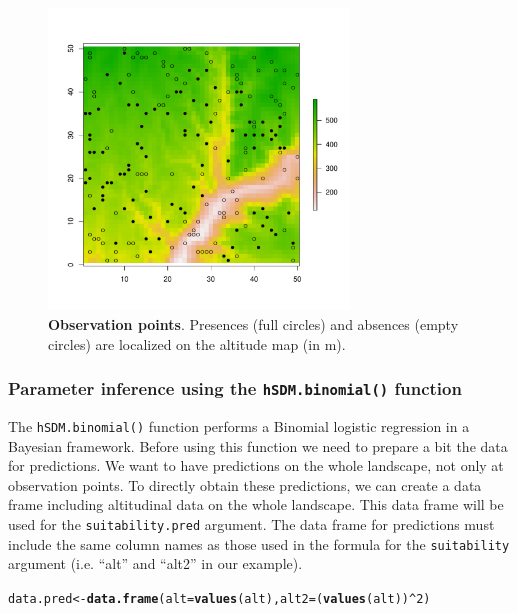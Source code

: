 \documentclass[a4paper, 12pt, leqno]{article}\usepackage[]{graphicx}\usepackage[]{color}
\makeatletter
\newcommand{\hlnum}[1]{\textcolor[rgb]{0.686,0.059,0.569}{#1}}%
\newcommand{\hlopt}[1]{\textcolor[rgb]{0,0,0}{#1}}%
\newcommand{\hlstd}[1]{\textcolor[rgb]{0.345,0.345,0.345}{#1}}%
\newcommand{\hlkwb}[1]{\textcolor[rgb]{0.69,0.353,0.396}{#1}}%
\newcommand{\hlkwc}[1]{\textcolor[rgb]{0.333,0.667,0.333}{#1}}%
\newcommand{\hlkwd}[1]{\textcolor[rgb]{0.737,0.353,0.396}{\textbf{#1}}}%
\newenvironment{kframe}{%
 \def\at@end@of@kframe{}%
 \ifinner\ifhmode%
  \def\at@end@of@kframe{\end{minipage}}%
  \begin{minipage}{\columnwidth}%
 \fi\fi%
 \def\FrameCommand##1{\hskip\@totalleftmargin \hskip-\fboxsep
 \colorbox{shadecolor}{##1}\hskip-\fboxsep
     \hskip-\linewidth \hskip-\@totalleftmargin \hskip\columnwidth}%
 \MakeFramed {\advance\hsize-\width
   \@totalleftmargin\z@ \linewidth\hsize
   \@setminipage}}%
 {\par\unskip\endMakeFramed%
 \at@end@of@kframe}
\newenvironment{knitrout}{}{} %
\makeatother
\begin{document}
\begin{figure}[!h] 
  \centering \includegraphics[width=8cm]{figures/observations-binomial.pdf}
  \caption{\textbf{Observation points}. Presences (full circles) and absences (empty
    circles) are localized on the altitude map (in m).}
  \label{fig:observations-binomial}
\end{figure}

\subsubsection{Parameter inference using the \texttt{hSDM.binomial()} function}

The \texttt{hSDM.binomial()} function performs a Binomial logistic regression in a
Bayesian framework. Before using this function we need to prepare a bit the data for
predictions. We want to have predictions on the whole landscape, not only at observation
points. To directly obtain these predictions, we can create a data frame including
altitudinal data on the whole landscape. This data frame will be used for the
\texttt{suitability.pred} argument. The data frame for predictions must include the same
column names as those used in the formula for the \texttt{suitability} argument
(i.e. ``alt'' and ``alt2'' in our example).

\begin{knitrout}\small
{}\color{fgcolor}\begin{kframe}
\begin{alltt}
\hlstd{data.pred} \hlkwb{<-} \hlkwd{data.frame}\hlstd{(}\hlkwc{alt}\hlstd{=}\hlkwd{values}\hlstd{(alt),}\hlkwc{alt2}\hlstd{=(}\hlkwd{values}\hlstd{(alt))}\hlopt{^}\hlnum{2}\hlstd{)}
\end{alltt}
\end{kframe}
\end{knitrout}
\end{document}
